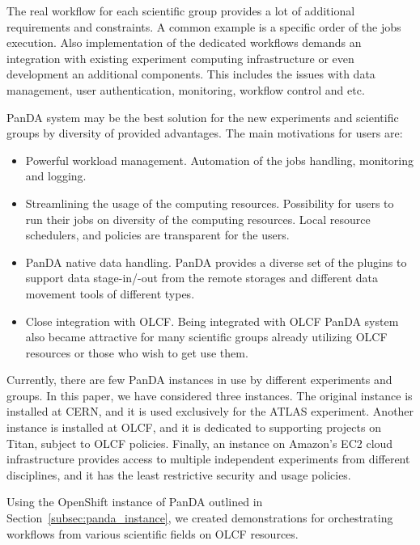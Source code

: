 The real workflow for each scientific group provides a lot of additional
requirements and constraints. A common example is a specific order of the jobs
execution. Also implementation of the dedicated workflows demands an
integration with existing experiment computing infrastructure or even
development an additional components. This includes the issues with data
management, user authentication, monitoring, workflow control and etc.

PanDA system may be the best solution for the new experiments and scientific
groups by diversity of provided advantages. The main motivations for users are:
\begin{itemize}
    \item Powerful workload management. Automation of the jobs handling,
        monitoring and logging.
    \item Streamlining the usage of the computing resources. Possibility for
        users to run their jobs on diversity of the computing resources. Local
        resource schedulers, and policies are transparent for the users.
    \item PanDA native data handling. PanDA provides a diverse set of the
        plugins to support data stage-in/-out from the remote storages and
        different data movement tools of different types.
    \item Close integration with OLCF. Being integrated with OLCF PanDA system
        also became attractive for many scientific groups already utilizing
        OLCF resources or those who wish to get use them. 
\end{itemize}

Currently, there are few PanDA instances in use by different experiments and
groups.  In this paper, we have considered three instances. The original
instance is installed at CERN, and it is used exclusively for the ATLAS
experiment. Another instance is installed at OLCF, and it is dedicated to
supporting projects on Titan, subject to OLCF policies. Finally, an instance on
Amazon's EC2 cloud infrastructure provides access to multiple independent
experiments from different disciplines, and it has the least restrictive
security and usage policies.


Using the OpenShift instance of PanDA outlined in Section~\ref{subsec:panda_instance}, we created demonstrations for orchestrating workflows from various
scientific fields on OLCF resources.


